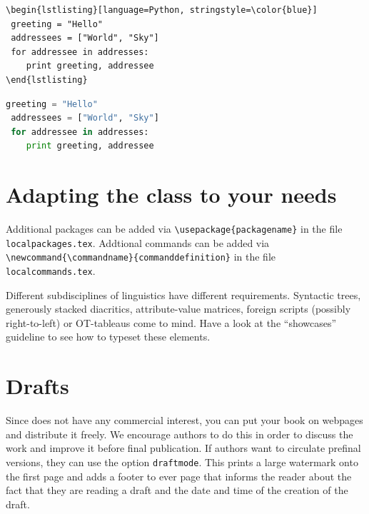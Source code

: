 \begin{verbatim}
\begin{lstlisting}[language=Python, stringstyle=\color{blue}]
 greeting = "Hello"
 addressees = ["World", "Sky"]
 for addressee in addresses:
    print greeting, addressee
\end{lstlisting}
\end{verbatim}
 
\begin{lstlisting}[language=Python, stringstyle=\color{blue}]
 greeting = "Hello"
 addressees = ["World", "Sky"]
 for addressee in addresses:
    print greeting, addressee
\end{lstlisting}

\section{Adapting the class to your needs}

Additional packages can be added via \verb+\usepackage{packagename}+ in the file \verb+localpackages.tex+.
Addtional commands can be added via \verb+\newcommand{\commandname}{commanddefinition}+ in the file \verb+localcommands.tex+. 


Different subdisciplines of linguistics have different requirements. Syntactic trees, generously stacked diacritics, attribute-value matrices, foreign scripts (possibly right-to-left) or OT-tableaus come to mind. Have a look at the ``showcases'' guideline to see how to typeset these elements.


 
   
\section{Drafts}

Since \lsp does not have any commercial interest, you can put your book on webpages and distribute it
freely. We encourage authors to do this in order to discuss the work and improve it before final
publication. If authors want to circulate prefinal versions, they can use the option
\texttt{draftmode}. This prints a large watermark onto the first page and adds a footer to ever page
that informs the reader about the fact that they are reading a draft and the date and time of the
creation of the draft.
  
